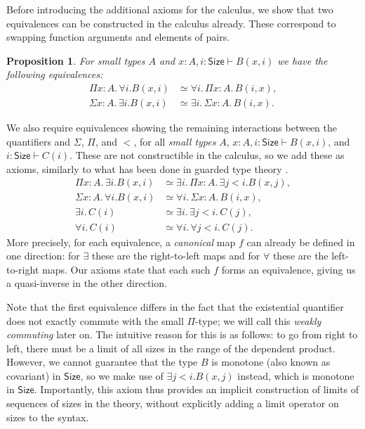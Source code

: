 \documentclass[10pt,a4paper]{article}
\newtheorem{proposition}[theorem]{Proposition}
\theoremstyle{definition}
\theoremstyle{remark}
\renewcommand{\.}{.\,} %
\renewcommand{\:}{:} %
\newcommand{\Size}{\mathsf{Size}}
\newcommand{\0}{\mathbf{0}}
\newcommand{\1}{\mathbf{1}}
\newcommand\<\langle
\renewcommand\>\rangle
\renewcommand\sf\mathsf
\theoremstyle{remark}
\begin{document}
Before introducing the additional axioms for the calculus, we show that two equivalences can be constructed in the calculus already.
These correspond to swapping function arguments and elements of pairs. 
\begin{proposition}\label{prop:definable-eqvs}
For small types \(A\) and \(x:A,i:\sf{Size}\vdash B(x,i)\) we have the following equivalences:
\begin{align*}
    \Pi x : A. \, \forall i. B(x, i)&\simeq\forall i \. \Pi x : A.\,B(i, x), \tag{\(\exists\) parametric over \(\Sigma\)} \\
    \Sigma x : A. \, \exists i . B(x, i)&\simeq\exists i \. \Sigma x : A. \, B(i, x). \tag{\(\forall\) parametric over \(\Pi\)}
\end{align*}
\end{proposition}
We also require equivalences showing the remaining interactions between the quantifiers and \(\Sigma\), \(\Pi\), and \(<\), for all \emph{small types} \(A\), \(x:A,i:\sf{Size}\vdash B(x,i)\), and \(i: \Size \vdash C(i)\).
These are not constructible in the calculus, so we add these as axioms, similarly to what has been done in guarded type theory \cite{mogelberg, guardedtypes16}.
\begin{align*}
    \Pi x : A.\,\exists i . B(x, i)&\simeq\exists i \. \Pi x : A. \, \exists j < i .B(x, j), \tag{\(\exists\) parametric over \(\Pi\)} \\
    \Sigma x:A.\,\forall i . B(x, i) &\simeq \forall i \. \Sigma x : A.\,B(i, x), \tag{\(\forall\) parametric over \(\Sigma\)} \\
    \exists i \.  C(i)&\simeq \exists i \. \exists j < i \.C(j), \tag{\(\exists\) parametric over \(<\)} \\
    \forall i \.  C(i) &\simeq \forall i \. \forall j < i \.C(j).  \tag{\(\forall\) parametric over \(<\)}
\end{align*}
More precisely, for each equivalence, a \emph{canonical} map $f$ can already be defined in one direction: for \(\exists\) these are the right-to-left maps and for \(\forall\) these are the left-to-right maps. 
Our axioms state that each such $f$ forms an equivalence, giving us a quasi-inverse in the other direction.

Note that the first equivalence differs in the fact that the existential quantifier does not exactly commute with the small $\Pi$-type; we will call this \emph{weakly commuting} later on. The intuitive reason for this is as follows: to go from right to left, there must be a limit of all sizes in the range of the dependent product. However, we cannot guarantee that the type $B$ is monotone (also known as covariant) in $\Size$, so we make use of $\exists j < i .B(x, j)$ instead, which is monotone in $\Size$. Importantly, this axiom thus provides an implicit construction of limits of sequences of sizes in the theory, without explicitly adding a limit operator on sizes to the syntax.
\end{document}
